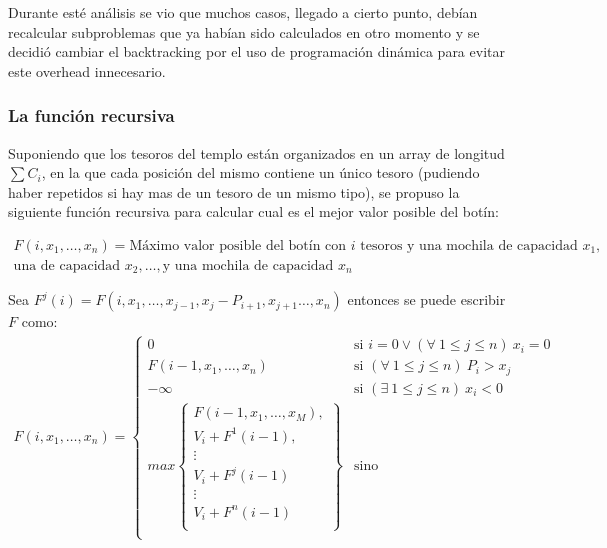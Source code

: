 Durante esté análisis se vio que muchos casos, llegado a cierto punto, debían recalcular subproblemas que ya habían sido calculados en otro momento y se decidió cambiar el backtracking por el uso de programación dinámica para evitar este overhead innecesario.

\subsubsection{La función recursiva}
Suponiendo que los tesoros del templo están organizados en un array de longitud $\sum C_i$, en la que cada posición del mismo contiene un único tesoro (pudiendo haber repetidos si hay mas de un tesoro de un mismo tipo), se propuso la siguiente función recursiva para calcular cual es el mejor valor posible del botín:

\begin{align*}
F(i, x_1, \dots, x_n) = \mbox{Máximo valor posible del botín con } i \mbox{ tesoros y una mochila de capacidad } x_1, \\ \mbox{una de capacidad }x_2,\dots, \mbox{y una mochila de capacidad }x_n    
\end{align*}

Sea $F^j(i) = F(i, x_1,\dots,x_{j-1}, x_j - P_{i+1},x_{j+1}\dots,x_n)$ entonces se puede escribir $F$ como:
\begin{align*} 
F(i, x_1, \dots, x_n) =
\left\{
	\begin{array}{ll}
	    0 & \mbox{si } i = 0 \lor (\forall~ 1 \leq j \leq n) ~ x_i = 0 \\
	    F(i-1, x_1, \dots, x_n) & \mbox{si } (\forall~ 1 \leq j \leq n) ~ P_i > x_j \\
	    -\infty & \mbox{si } (\exists ~ 1 \leq j \leq n) ~x_i < 0 \\
	    max\left\{\begin{array}{c}
	        F(i-1, x_1, \dots, x_M), \\
	        V_i + F^1(i-1), \\
	        \vdots\\
	        V_i + F^j(i-1) \\
	        \vdots \\
	       V_i + F^n(i-1)\\
	    \end{array}
	       \right\} & \mbox{sino} \\
	\end{array}
\right.
\end{align*}

